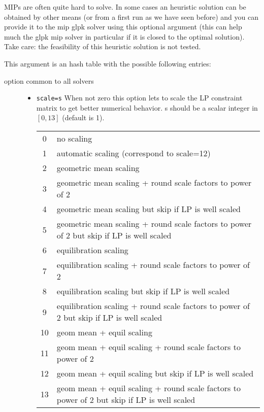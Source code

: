 \begin{mandescription}
MIPs are often quite hard to solve. In some cases an heuristic solution
can be obtained by other means (or from a first run as we have seen before)
and you can provide it to the mip glpk solver using this optional argument 
(this can help much the glpk mip solver in particular if it is closed to 
the optimal solution). Take care: the feasibility of this  heuristic 
solution is not tested.

This argument is an hash table with the possible following entries:
\begin{description}
\item[option common to all solvers]
\begin{itemize}
\item \verb+scale=s+ When not zero this option lets to scale the LP constraint matrix to get better 
      numerical behavior.  s should be a scalar integer in $[0,13]$ (default is 1).
      \begin{tabular}{|c|l|}
        \hline
        0 & no scaling \\
        1 & automatic scaling (correspond to scale=12) \\
        2 & geometric mean scaling\\
        3 & geometric mean scaling + round scale factors to power of 2\\
        4 & geometric mean scaling but skip if LP is well scaled\\
        5 & geometric mean scaling + round scale factors to power of 2 but skip if LP is well scaled\\
        6 & equilibration scaling\\
        7 & equilibration scaling + round scale factors to power of 2\\
        8 & equilibration scaling but skip if LP is well scaled\\
        9 & equilibration scaling + round scale factors to power of 2 but skip if LP is well scaled\\
       10 & geom mean + equil scaling\\
       11 & geom mean + equil scaling  + round scale factors to power of 2\\
       12 & geom mean + equil scaling but skip if LP is well scaled\\
       13 &  geom mean + equil scaling + round scale factors to power of 2 but skip if LP is well scaled\\
       \hline

\end{tabular}
\end{itemize}
\end{description}
\end{mandescription}

